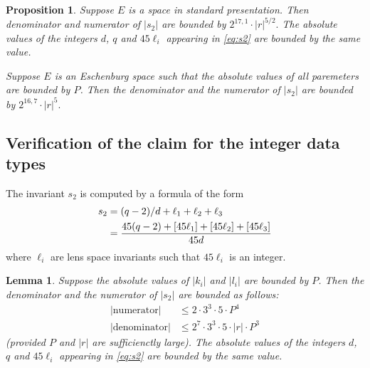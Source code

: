 \documentclass{article}
\newtheorem{lem}[thm]{Lemma}
\newtheorem{prop}[thm]{Proposition}
\newcommand{\abs}[1]{\left|#1\right|}
\begin{document}
{\color{gray}
\begin{prop}
  Suppose \(E\) is a space in standard presentation.
  Then denominator and numerator of \(\abs{s_2}\) are bounded by 
  \(
      2^{17,1}·\abs{r}^{5/2}.
  \)
  The absolute values of the integers \(d\), \(q\) and \(45\ell_i\) appearing in \eqref{eq:s2} are bounded by the same value.

  Suppose \(E\) is an Eschenburg space such that the absolute values of all paremeters are bounded by \(P\).  Then the denominator and the numerator of \(\abs{s_2}\) are bounded by 
  \(
    2^{16,7}·\abs{r}^{5}.
  \)
\end{prop}
}


\subsection{Verification of the claim for the integer data types}
The invariant \(s_2\) is computed by a formula of the form
\begin{align}\label{eq:s2}
  \notag  s_2   &= (q-2)/d + \ell_1 + \ell_2 + \ell_3\\
                &= \frac{45(q-2) + [45\ell_1] + [45\ell_2] + [45\ell_3]}{45d}
\end{align}  
where \(\ell_i\) are lens space invariants such that \(45\ell_i\) is an integer.  

\begin{lem}\label{lem:s2}
  Suppose the absolute values of \(\abs{k_i}\) and \(\abs{l_i}\) are bounded by \(P\).  Then  the denominator and the numerator of \(\abs{s_2}\) are bounded as follows:
  \begin{align*}
    \abs{\text{numerator}}   &\leq 2·3^3·5·P^4\\
    \abs{\text{denominator}} &\leq 2^7·3^3·5·\abs{r}·P^3
  \end{align*}
  (provided \(P\) and \(\abs{r}\) are sufficienctly large).  The absolute values of the integers \(d\), \(q\) and \(45\ell_i\) appearing in \eqref{eq:s2} are bounded by the same value.
\end{lem}
 
\end{document}
